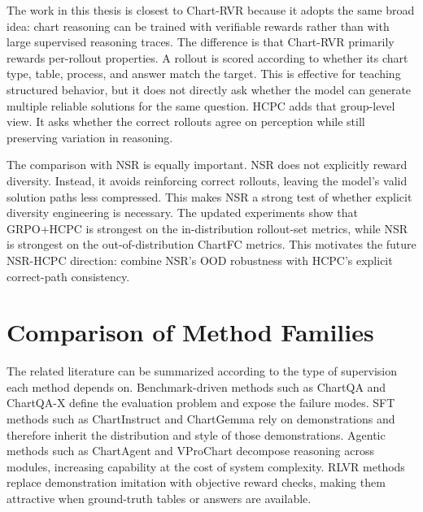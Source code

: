 \documentclass{iutbscthesis}
\begin{document}
The work in this thesis is closest to Chart-RVR because it adopts the same broad idea: chart reasoning can be trained with verifiable rewards rather than with large supervised reasoning traces. The difference is that Chart-RVR primarily rewards per-rollout properties. A rollout is scored according to whether its chart type, table, process, and answer match the target. This is effective for teaching structured behavior, but it does not directly ask whether the model can generate multiple reliable solutions for the same question. HCPC adds that group-level view. It asks whether the correct rollouts agree on perception while still preserving variation in reasoning.

The comparison with NSR is equally important. NSR does not explicitly reward diversity. Instead, it avoids reinforcing correct rollouts, leaving the model's valid solution paths less compressed. This makes NSR a strong test of whether explicit diversity engineering is necessary. The updated experiments show that GRPO+HCPC is strongest on the in-distribution rollout-set metrics, while NSR is strongest on the out-of-distribution ChartFC metrics. This motivates the future NSR-HCPC direction: combine NSR's OOD robustness with HCPC's explicit correct-path consistency.

\section{Comparison of Method Families}

The related literature can be summarized according to the type of supervision each method depends on. Benchmark-driven methods such as ChartQA and ChartQA-X define the evaluation problem and expose the failure modes. SFT methods such as ChartInstruct and ChartGemma rely on demonstrations and therefore inherit the distribution and style of those demonstrations. Agentic methods such as ChartAgent and VProChart decompose reasoning across modules, increasing capability at the cost of system complexity. RLVR methods replace demonstration imitation with objective reward checks, making them attractive when ground-truth tables or answers are available.
\end{document}
